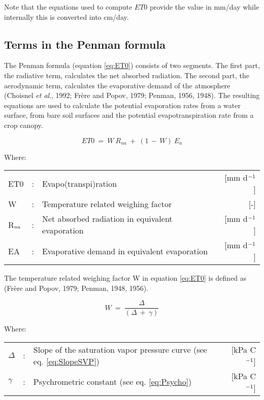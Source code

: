 Note that the equations used to compute $ET0$ provide the value in mm/day while internally
this is converted into cm/day.

\subsection{Terms in the Penman formula}
\label{sec:penman}

The Penman formula (equation \ref{eq:ET0}) consists of two segments. The first part, the radiative
term, calculates the net absorbed radiation. The second part, the aerodynamic term,
calculates the evapora\-tive demand of the atmo\-sphere (Choisnel {\it et al}., 1992; Fr\`{e}re and
Popov, 1979; Penman, 1956, 1948). The resulting equations are used to calculate the
potential evapora\-tion rates from a water surface, from bare soil surfaces and the potential
evapotranspira\-tion rate from a crop canopy.

\begin{equation}
\label{eq:ET0}
ET0 ~=~ W ~R _{na} ~+~(1\, -\, W) ~E _{a} 
\end{equation}

Where:\\[5pt]
\begin{tabularx}{\textwidth}{llXr}
	ET0&:& Evapo(transpi)ration & [mm d$^{{\rm -1}}$] \\
	W&:& Temperature related weighing factor &  [-] \\
	R$_{{\rm na}}$&: & Net absorbed radiation in equivalent evaporation & [mm d$^{{\rm -1}}$] \\
	EA&: &  Evaporative demand in equivalent evaporation & [mm d$^{{\rm -1}}$] \\
\end{tabularx}

The temperature related weighing factor W in equation \ref{eq:ET0} is defined as 
(Fr\`{e}re and Popov, 1979; Penman, 1948, 1956).

\begin{equation}
W ~=~{\frac{\Delta}{(\Delta ~+~ \gamma )}} 
\end{equation}

Where:\\[5pt]
\begin{tabularx}{\textwidth}{llXr}
	$\Delta$ &:& Slope of the saturation vapor pressure curve (see eq. \ref{eq:SlopeSVP})  & [kPa \textdegree C$^{{\rm -1}}$]\\
	$\gamma$ &:& Psychrometric constant (see eq. \ref{eq:Psycho})  & [kPa \degrees C$^{{\rm -1}}$]
\end{tabularx}


